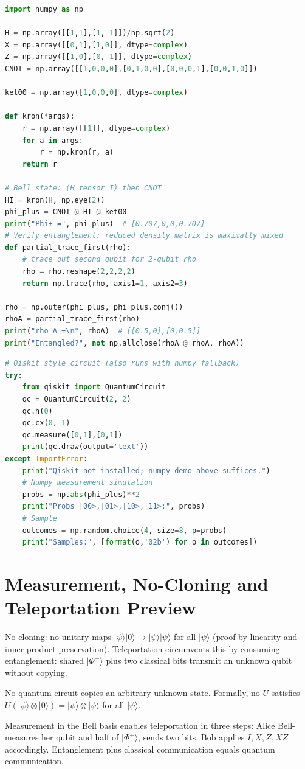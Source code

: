\begin{lstlisting}[language=Python]
import numpy as np

H = np.array([[1,1],[1,-1]])/np.sqrt(2)
X = np.array([[0,1],[1,0]], dtype=complex)
Z = np.array([[1,0],[0,-1]], dtype=complex)
CNOT = np.array([[1,0,0,0],[0,1,0,0],[0,0,0,1],[0,0,1,0]])

ket00 = np.array([1,0,0,0], dtype=complex)

def kron(*args):
    r = np.array([[1]], dtype=complex)
    for a in args:
        r = np.kron(r, a)
    return r

# Bell state: (H tensor I) then CNOT
HI = kron(H, np.eye(2))
phi_plus = CNOT @ HI @ ket00
print("Phi+ =", phi_plus)  # [0.707,0,0,0.707]
# Verify entanglement: reduced density matrix is maximally mixed
def partial_trace_first(rho):
    # trace out second qubit for 2-qubit rho
    rho = rho.reshape(2,2,2,2)
    return np.trace(rho, axis1=1, axis2=3)

rho = np.outer(phi_plus, phi_plus.conj())
rhoA = partial_trace_first(rho)
print("rho_A =\n", rhoA)  # [[0.5,0],[0,0.5]]
print("Entangled?", not np.allclose(rhoA @ rhoA, rhoA))
\end{lstlisting}

\begin{lstlisting}[language=Python]
# Qiskit style circuit (also runs with numpy fallback)
try:
    from qiskit import QuantumCircuit
    qc = QuantumCircuit(2, 2)
    qc.h(0)
    qc.cx(0, 1)
    qc.measure([0,1],[0,1])
    print(qc.draw(output='text'))
except ImportError:
    print("Qiskit not installed; numpy demo above suffices.")
    # Numpy measurement simulation
    probs = np.abs(phi_plus)**2
    print("Probs |00>,|01>,|10>,|11>:", probs)
    # Sample
    outcomes = np.random.choice(4, size=8, p=probs)
    print("Samples:", [format(o,'02b') for o in outcomes])
\end{lstlisting}


\section{Measurement, No-Cloning and Teleportation Preview}
No-cloning: no unitary maps $\lvert\psi\rangle\lvert0\rangle\to\lvert\psi\rangle\lvert\psi\rangle$ for all $\lvert\psi\rangle$ (proof by linearity and inner-product preservation). Teleportation circumvents this by consuming entanglement: shared $\lvert\Phi^+\rangle$ plus two classical bits transmit an unknown qubit without copying.

\begin{theorem}[No-cloning]
No quantum circuit copies an arbitrary unknown state. Formally, no $U$ satisfies $U(\lvert\psi\rangle\otimes\lvert0\rangle)=\lvert\psi\rangle\otimes\lvert\psi\rangle$ for all $\lvert\psi\rangle$.
\end{theorem}
Measurement in the Bell basis enables teleportation in three steps: Alice Bell-measures her qubit and half of $\lvert\Phi^+\rangle$, sends two bits, Bob applies $I,X,Z,XZ$ accordingly. Entanglement plus classical communication equals quantum communication.

